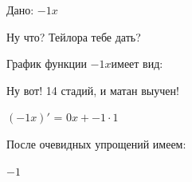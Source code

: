 \documentclass{article}
\begin{document}
\center
Дано: $-1x$

\bigskip Ну что? Тейлора тебе дать?


\bigskip График функции $-1x$имеет вид:

\begin{figure}[h]\label{fig:t}\end{figure}


\bigskip Ну вот! 14 стадий, и матан выучен!

$(-1x)'$ = $0x + -1 \cdot 1$

\bigskip После очевидных упрощений имеем:

$-1$
\end{document}

